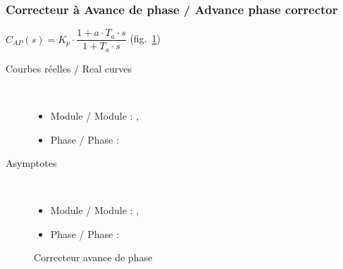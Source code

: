 \documentclass[a4paper,12pt]{article}                      %
\newcommand{\TradEnLigne}[2]{
#1 / {\color{blue}#2}
}
\begin{document}
\newpage

\subsubsection{\TradEnLigne{Correcteur à Avance de phase}{Advance phase corrector}} 

$C_{AP}(s)=K_p\cdot\dfrac{1+a\cdot T_a \cdot s}{1+T_a\cdot s}$ (fig.~\ref{fig:corav})

\begin{description}
\item[\TradEnLigne{Courbes réelles}{Real curves}]~\\
\begin{itemize}
\item \TradEnLigne{Module}{Module}: ,
\item \TradEnLigne{Phase}{Phase}: 
\end{itemize}
\item[Asymptotes]~\\
\begin{itemize}
\item \TradEnLigne{Module}{Module}: ,
\item \TradEnLigne{Phase}{Phase}:  
\end{itemize}
\end{description}



\begin{figure}[!ht]
\centering
\begin{tikzexample}[title=,righthand width=0.5\textwidth,] 
\end{tikzexample}
\caption{Correcteur avance de phase}
\label{fig:corav}
\end{figure}

\clearpage
\end{document}
